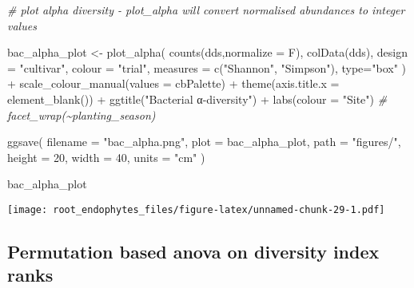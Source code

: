 \documentclass[
]{article}
\newenvironment{Shaded}{\begin{snugshade}}{\end{snugshade}}
\newcommand{\AttributeTok}[1]{\textcolor[rgb]{0.77,0.63,0.00}{#1}}
\newcommand{\CommentTok}[1]{\textcolor[rgb]{0.56,0.35,0.01}{\textit{#1}}}
\newcommand{\DecValTok}[1]{\textcolor[rgb]{0.00,0.00,0.81}{#1}}
\newcommand{\FunctionTok}[1]{\textcolor[rgb]{0.00,0.00,0.00}{#1}}
\newcommand{\NormalTok}[1]{#1}
\newcommand{\OtherTok}[1]{\textcolor[rgb]{0.56,0.35,0.01}{#1}}
\newcommand{\SpecialCharTok}[1]{\textcolor[rgb]{0.00,0.00,0.00}{#1}}
\newcommand{\StringTok}[1]{\textcolor[rgb]{0.31,0.60,0.02}{#1}}
\begin{document}
\begin{Shaded}
\begin{Highlighting}[]
\CommentTok{\# plot alpha diversity {-} plot\_alpha will convert normalised abundances to integer values}

\NormalTok{bac\_alpha\_plot }\OtherTok{\textless{}{-}} \FunctionTok{plot\_alpha}\NormalTok{(}
  \FunctionTok{counts}\NormalTok{(dds,}\AttributeTok{normalize =}\NormalTok{ F), }\FunctionTok{colData}\NormalTok{(dds),}
  \AttributeTok{design =} \StringTok{"cultivar"}\NormalTok{, }\AttributeTok{colour =} \StringTok{"trial"}\NormalTok{,}
  \AttributeTok{measures =} \FunctionTok{c}\NormalTok{(}\StringTok{"Shannon"}\NormalTok{, }\StringTok{"Simpson"}\NormalTok{),}
  \AttributeTok{type=}\StringTok{"box"}
\NormalTok{) }\SpecialCharTok{+} 
  \FunctionTok{scale\_colour\_manual}\NormalTok{(}\AttributeTok{values =}\NormalTok{ cbPalette) }\SpecialCharTok{+} 
  \FunctionTok{theme}\NormalTok{(}\AttributeTok{axis.title.x =}  \FunctionTok{element\_blank}\NormalTok{()) }\SpecialCharTok{+} 
  \FunctionTok{ggtitle}\NormalTok{(}\StringTok{"Bacterial α{-}diversity"}\NormalTok{) }\SpecialCharTok{+} 
  \FunctionTok{labs}\NormalTok{(}\AttributeTok{colour =} \StringTok{"Site"}\NormalTok{)}
  \CommentTok{\# facet\_wrap(\textasciitilde{}planting\_season)}

\FunctionTok{ggsave}\NormalTok{(}
  \AttributeTok{filename =} \StringTok{"bac\_alpha.png"}\NormalTok{, }\AttributeTok{plot =}\NormalTok{ bac\_alpha\_plot, }\AttributeTok{path =} \StringTok{"figures/"}\NormalTok{, }
  \AttributeTok{height =} \DecValTok{20}\NormalTok{, }\AttributeTok{width =} \DecValTok{40}\NormalTok{, }\AttributeTok{units =} \StringTok{"cm"}
\NormalTok{)}

\NormalTok{bac\_alpha\_plot}
\end{Highlighting}
\end{Shaded}

\texttt{[image: root\_endophytes\_files/figure-latex/unnamed-chunk-29-1.pdf]}

\hypertarget{permutation-based-anova-on-diversity-index-ranks-1}{%
\subsection{Permutation based anova on diversity index
ranks}\label{permutation-based-anova-on-diversity-index-ranks-1}}
\end{document}

